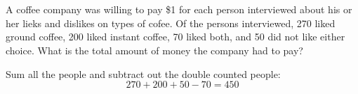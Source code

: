 \documentclass[12pt,letterpaper,boxed]{hmcpset}
\begin{document}
\begin{problem}[Shahriari 8.1.1][20]\\
\\
A coffee company was willing to pay \$1 for each person interviewed about his or her lieks and dislikes on types of cofee. Of the persons interviewed, 270 liked ground coffee, 200 liked instant coffee, 70 liked both, and 50 did not like either choice. What is the total amount of money the company had to pay?
\
\end{problem}
\begin{solution}

Sum all the people and subtract out the double counted people:
$$270+200+50-70 = \boxed{450}$$

\end{solution}
\end{document}
